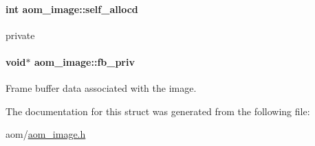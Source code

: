 \paragraph[{\texorpdfstring{self\+\_\+allocd}{self_allocd}}]{\setlength{\rightskip}{0pt plus 5cm}int aom\+\_\+image\+::self\+\_\+allocd}\hypertarget{structaom__image_adcb959372df75813c6b1e01903ec3011}{}\label{structaom__image_adcb959372df75813c6b1e01903ec3011}
private 
\paragraph[{\texorpdfstring{fb\+\_\+priv}{fb_priv}}]{\setlength{\rightskip}{0pt plus 5cm}void$\ast$ aom\+\_\+image\+::fb\+\_\+priv}\hypertarget{structaom__image_aab189cb8d141a7b46102a913327398b3}{}\label{structaom__image_aab189cb8d141a7b46102a913327398b3}
Frame buffer data associated with the image. 

The documentation for this struct was generated from the following file\+:\begin{DoxyCompactItemize}
\item 
aom/\hyperlink{aom__image_8h}{aom\+\_\+image.\+h}\end{DoxyCompactItemize}
